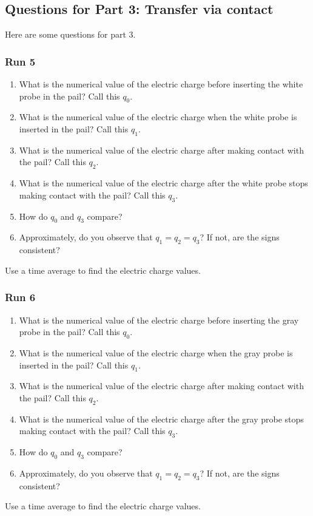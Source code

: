 \subsection{Questions for Part 3: Transfer via contact}
Here are some questions for part 3.
\subsubsection{Run 5}
\begin{enumerate}
	\item What is the numerical value of the electric charge before inserting the white probe in the pail? Call this $q_{0}$.
	\item What is the numerical value of the electric charge when the white probe is inserted in the pail? Call this $q_{1}$.
	\item What is the numerical value of the electric charge after making contact with the pail? Call this $q_{2}$.
	\item What is the numerical value of the electric charge after the white probe stops making contact with the pail? Call this $q_{3}$.
	\item How do $q_{0}$ and $q_{3}$ compare?
	\item Approximately, do you observe that $q_{1} = q_{2} = q_{3}$? If not, are the signs consistent?
\end{enumerate}
Use a time average to find the electric charge values.
\subsubsection{Run 6}
\begin{enumerate}
	\item What is the numerical value of the electric charge before inserting the gray probe in the pail? Call this $q_{0}$.
	\item What is the numerical value of the electric charge when the gray probe is inserted in the pail? Call this $q_{1}$.
	\item What is the numerical value of the electric charge after making contact with the pail? Call this $q_{2}$.
	\item What is the numerical value of the electric charge after the gray probe stops making contact with the pail? Call this $q_{3}$.
	\item How do $q_{0}$ and $q_{3}$ compare?
	\item Approximately, do you observe that $q_{1} = q_{2} = q_{3}$? If not, are the signs consistent?
\end{enumerate}
Use a time average to find the electric charge values.
